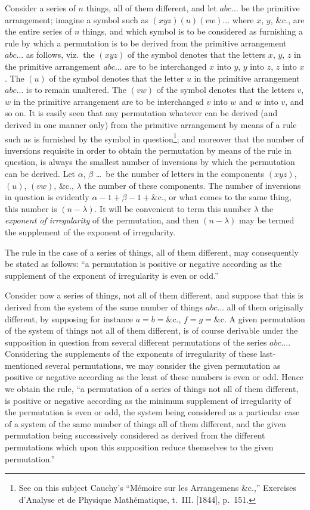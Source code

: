 \documentclass[11pt,a4paper]{article}
\theoremstyle{definition}
\begin{document}
Consider a series of $n$ things, all of them different, and let $abc\ldots$ be the primitive arrangement; imagine a symbol such as $(xyz)(u)(vw)\ldots$ where $x$, $y$, \&c., are the entire series of $n$ things, and which symbol is to be considered as furnishing a rule by which a permutation is to be derived from the primitive arrangement $abc\ldots$ as follows, viz.\ the $(xyz)$ of the symbol denotes that the letters $x$, $y$, $z$ in the primitive arrangement $abc\ldots$ are to be interchanged $x$ into $y$, $y$ into $z$, $z$ into $x$. The $(u)$ of the symbol denotes that the letter $u$ in the primitive arrangement $abc\ldots$ is to remain unaltered. The $(vw)$ of the symbol denotes that the letters $v$, $w$ in the primitive arrangement are to be interchanged $v$ into $w$ and $w$ into $v$, and so on. It is easily seen that any permutation whatever can be derived (and derived in one manner only) from the primitive arrangement by means of a rule such as is furnished by the symbol in question\footnote{See on this subject Cauchy's ``M\'{e}moire sur les Arrangemens \&c.,'' Exercises d'Analyse et de Physique Math\'{e}matique, t.~III. [1844], p.~151.}; and moreover that the number of inversions requisite in order to obtain the permutation by means of the rule in question, is always the smallest number of inversions by which the permutation can be derived. Let $\alpha$, $\beta$ \ldots\ be the number of letters in the components $(xyz)$, $(u)$, $(vw)$, \&c., $\lambda$ the number of these components. The number of inversions in question is evidently $\alpha-1 + \beta-1 + \&$c., or what comes to the same thing, this number is $(n - \lambda)$. It will be convenient to term this number $\lambda$ the \textit{exponent of irregularity} of the permutation, and then $(n - \lambda)$ may be termed the supplement of the exponent of irregularity.

The rule in the case of a series of things, all of them different, may consequently be stated as follows: ``a permutation is positive or negative according as the supplement of the exponent of irregularity is even or odd.''

Consider now a series of things, not all of them different, and suppose that this is derived from the system of the same number of things $abc\ldots$ all of them originally different, by supposing for instance $a = b = \&$c., $f = g = \&$c. A given permutation of the system of things not all of them different, is of course derivable under the supposition in question from several different permutations of the series $abc\ldots$. Considering the supplements of the exponents of irregularity of these last-mentioned several permutations, we may consider the given permutation as positive or negative according as the least of these numbers is even or odd. Hence we obtain the rule, ``a permutation of a series of things not all of them different, is positive or negative according as the minimum supplement of irregularity of the permutation is even or odd, the system being considered as a particular case of a system of the same number of things all of them different, and the given permutation being successively considered as derived from the different permutations which upon this supposition reduce themselves to the given permutation.''
\end{document}

